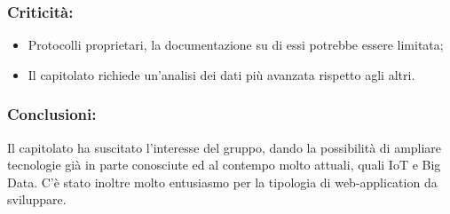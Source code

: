 	\subsubsection{Criticità:}
		\begin{itemize}
			\item Protocolli proprietari, la documentazione su di essi potrebbe essere limitata;
			\item Il capitolato richiede un'analisi dei dati più avanzata rispetto agli altri.
		\end{itemize}

	\subsubsection{Conclusioni:}
		Il capitolato ha suscitato l'interesse del gruppo, dando la possibilità di ampliare tecnologie già in parte conosciute ed al contempo molto attuali, quali IoT e Big Data. C'è stato inoltre molto entusiasmo per la tipologia di web-application da sviluppare.

